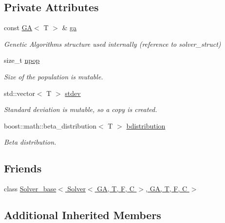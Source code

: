 \subsection*{Private Attributes}
\begin{DoxyCompactItemize}
\item 
const \hyperlink{structea_1_1_g_a}{GA}$<$ T $>$ \& \hyperlink{classea_1_1_solver_3_01_g_a_00_01_t_00_01_f_00_01_c_01_4_a5e56c4d15894af96c2be5fcaec7d14fb}{ga}
\begin{DoxyCompactList}\small\item\em Genetic Algorithms structure used internally (reference to solver\+\_\+struct) \end{DoxyCompactList}\item 
size\+\_\+t \hyperlink{classea_1_1_solver_3_01_g_a_00_01_t_00_01_f_00_01_c_01_4_a805f49211363542de6984c7fd2c97c9c}{npop}
\begin{DoxyCompactList}\small\item\em Size of the population is mutable. \end{DoxyCompactList}\item 
std\+::vector$<$ T $>$ \hyperlink{classea_1_1_solver_3_01_g_a_00_01_t_00_01_f_00_01_c_01_4_a097a7ec4bbcf9e5bade6e498d55d4d11}{stdev}
\begin{DoxyCompactList}\small\item\em Standard deviation is mutable, so a copy is created. \end{DoxyCompactList}\item 
boost\+::math\+::beta\+\_\+distribution$<$ T $>$ \hyperlink{classea_1_1_solver_3_01_g_a_00_01_t_00_01_f_00_01_c_01_4_a01dbd57c74c1ebd73e4ac976e29ecb33}{bdistribution}
\begin{DoxyCompactList}\small\item\em Beta distribution. \end{DoxyCompactList}\end{DoxyCompactItemize}
\subsection*{Friends}
\begin{DoxyCompactItemize}
\item 
class \hyperlink{classea_1_1_solver_3_01_g_a_00_01_t_00_01_f_00_01_c_01_4_a36e0662bcb575fd6a11cec4eedf85117}{Solver\+\_\+base$<$ Solver$<$ G\+A, T, F, C $>$, G\+A, T, F, C $>$}
\end{DoxyCompactItemize}
\subsection*{Additional Inherited Members}


